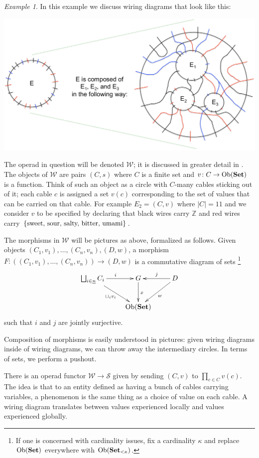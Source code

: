 \documentclass{book}
\def\tn{\textnormal}
\def\mc{\mathcal}
\def\ZZ{{\mathbb Z}}
\def\Ob{\tn{Ob}}
\def\to{\rightarrow}
\def\taking{\colon}
\def\too{\longrightarrow}
\def\ul{\underline}
\def\Set{{\bf Set}}
\def\mcS{\mc{S}}
\def\mcW{\mc{W}}
\theoremstyle{remark}
\newtheorem{example}[subsubsection]{Example}
\theoremstyle{definition}
\begin{document}
\begin{example}

In this example we discuss wiring diagrams that look like this:
\begin{center}
\includegraphics[width=\textwidth]{wiringDiagram}
\end{center}
The operad in question will be denoted $\mcW$; it is discussed in greater detail in \cite{Sp4}. The objects of $\mcW$ are pairs $(C,s)$ where $C$ is a finite set and $v\taking C\to\Ob(\Set)$ is a function. Think of such an object as a circle with $C$-many cables sticking out of it; each cable $c$ is assigned a set $v(c)$ corresponding to the set of values that can be carried on that cable. For example $E_2=(C,v)$ where $|C|=11$ and we consider $v$ to be specified by declaring that black wires carry $\ZZ$ and red wires carry $\{\tn{sweet, sour, salty, bitter, umami}\}$. 

The morphisms in $\mcW$ will be pictures as above, formalized as follows. Given objects $(C_1,v_1),\ldots,(C_n,v_n), (D,w)$, a morphism $F\taking((C_1,v_1),\ldots,(C_n,v_n))\too (D,w)$ is a commutative diagram of sets
\footnote{If one is concerned with cardinality issues, fix a cardinality $\kappa$ and replace $\Ob(\Set)$ everywhere with $\Ob(\Set_{<\kappa})$.} 
$$
\xymatrix{\bigsqcup_{i\in\ul{n}}C_i\ar[rd]_{\sqcup_iv_i}\ar[r]^i&G\ar[d]^x&D\ar[l]_j\ar[ld]^w\\&\Ob(\Set)}
$$
such that $i$ and $j$ are jointly surjective.

Composition of morphisms is easily understood in pictures: given wiring diagrams inside of wiring diagrams, we can throw away the intermediary circles. In terms of sets, we perform a pushout.

There is an operad functor $\mcW\to\mcS$ given by sending $(C,v)$ to $\prod_{c\in C}v(c)$. The idea is that to an entity defined as having a bunch of cables carrying variables, a phenomenon is the same thing as a choice of value on each cable. A wiring diagram translates between values experienced locally and values experienced globally. 

\end{example}
\end{document}
